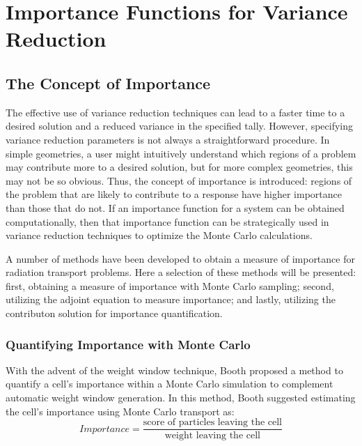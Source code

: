 \section{Importance Functions for Variance Reduction}
\label{sec:Importance}

\subsection{The Concept of Importance}
\label{sec:Importance}

The effective use of variance reduction techniques can lead to a faster time to
a desired solution and a reduced variance in the specified tally. However,
specifying variance reduction parameters is not always a straightforward
procedure. In simple geometries, a user might intuitively understand which
regions of a problem may contribute more to a desired solution, but for more
complex geometries, this may not be so obvious. Thus, the concept of importance
is introduced: regions of the problem that are likely to contribute to a
response have higher importance than those that do not. If an importance
function for a system can be obtained computationally, then that importance
function can be
strategically used in variance reduction techniques to optimize the Monte Carlo
calculations.

A number of methods have been developed to obtain a measure of importance for
radiation transport problems. Here a selection of these methods will be
presented: first, obtaining a measure of importance with Monte Carlo sampling;
second, utilizing the adjoint equation to measure importance; and lastly,
utilizing the contributon solution for importance quantification.

\subsubsection{Quantifying Importance with Monte Carlo}

With the advent of the weight window technique, Booth
\cite{booth_automatic_1982} proposed
a method to quantify a cell's importance within a Monte Carlo simulation to
complement automatic weight window generation. In
this method, Booth suggested estimating the cell's importance using Monte Carlo
transport as:
\begin{equation}
  Importance  = \frac{\text{score of particles leaving the cell}}
                     {\text{weight leaving the cell}}
\label{eq:BoothImp}
\end{equation}

